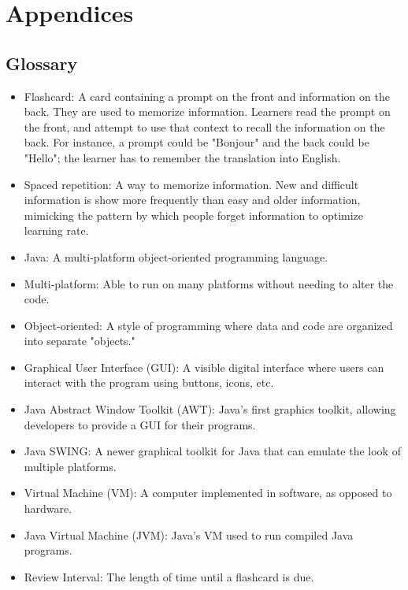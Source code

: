 \documentclass{scrreprt}
\begin{document}
\chapter{Appendices}

\section{Glossary}
\begin{itemize}
    \item Flashcard: A card containing a prompt on the front and information on the back.
        They are used to memorize information.
        Learners read the prompt on the front, and attempt to use that context to recall the information on the back.
        For instance, a prompt could be "Bonjour" and the back could be "Hello"; the learner has to remember the translation into English.
    \item Spaced repetition: A way to memorize information. New and difficult information
        is show more frequently than easy and older information, mimicking the pattern
        by which people forget information to optimize learning rate.
    \item Java: A multi-platform object-oriented programming language.
    \item Multi-platform: Able to run on many platforms without needing to alter the code.
    \item Object-oriented: A style of programming where data and code are organized into
        separate "objects."
    \item Graphical User Interface (GUI): A visible digital interface where users can 
        interact with the program using buttons, icons, etc.
    \item Java Abstract Window Toolkit (AWT): Java's first graphics toolkit, allowing developers
        to provide a GUI for their programs.
    \item Java SWING: A newer graphical toolkit for Java that can emulate the look of multiple platforms.
    \item Virtual Machine (VM): A computer implemented in software, as opposed to hardware.
    \item Java Virtual Machine (JVM): Java's VM used to run compiled Java programs.
    \item Review Interval: The length of time until a flashcard is due.
\end{itemize}
\end{document}
